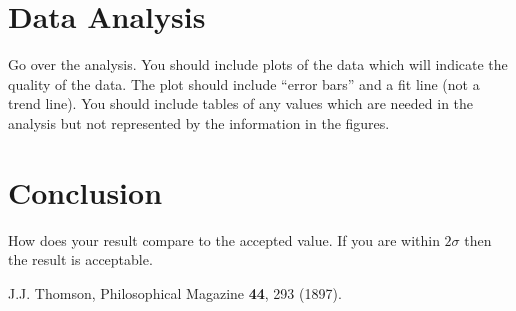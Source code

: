 \documentclass[aps,prl,twocolumn]{revtex4-2}
\begin{document}
\section{Data Analysis}
Go over the analysis.  You should include plots of the data which will indicate the quality of the data.  The plot should include ``error bars'' and a fit line (not a trend line).  You should include tables of any values which are needed in the analysis but not represented by the information in the figures.

\section{Conclusion}
How does your result compare to the accepted value.  If you are within $2\sigma$ then the result is acceptable.

\begin{thebibliography}{9}
 J.J. Thomson, Philosophical Magazine \textbf{44}, 293 (1897).
\end{thebibliography}
\end{document}
